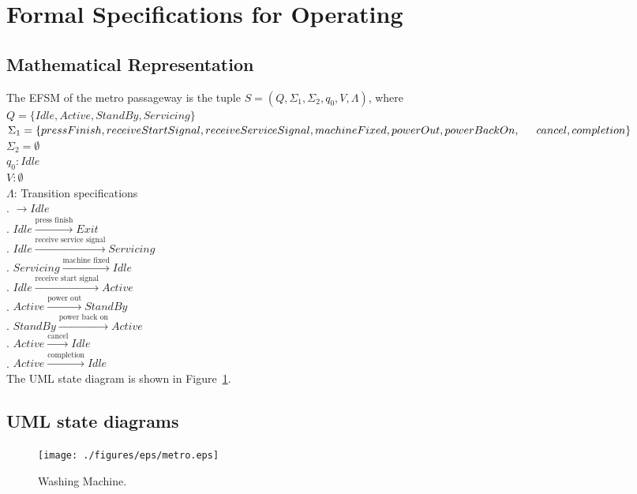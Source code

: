 \newpage
\section{Formal Specifications for Operating}

\subsection{Mathematical Representation}

\noindent The EFSM of the metro passageway is the tuple $S = (Q, \Sigma_1, \Sigma_2, q_0, V, \Lambda)$, where\\

\noindent $Q = \{Idle, Active, StandBy, Servicing\}$\\
\noindent $\Sigma_1 = \{press Finish, receive Start Signal, receive Service Signal, machine Fixed, power Out, power Back On, \\
\indent cancel, completion\}$\\
\noindent $\Sigma_2 = \emptyset$\\
\noindent $q_0: Idle$\\
\noindent $V: \emptyset$\\
\noindent $\Lambda$: Transition specifications\\
. $\rightarrow Idle$\\
. $Idle \xrightarrow {\text {press finish}} Exit$\\
. $Idle \xrightarrow {\text {receive service signal}} Servicing$\\
. $Servicing \xrightarrow {\text {machine fixed}} Idle$\\
. $Idle \xrightarrow {\text {receive start signal}} Active$\\
. $Active \xrightarrow {\text {power out}} StandBy$\\
. $StandBy \xrightarrow {\text {power back on}} Active$\\
. $Active \xrightarrow {\text {cancel}} Idle$\\
. $Active \xrightarrow {\text {completion}} Idle$\\

\noindent The UML state diagram is shown in Figure~\ref{fig:operating}.

\newpage

\subsection{UML state diagrams}

\begin{figure}[h!]
	\centering
		\texttt{[image: ./figures/eps/metro.eps]}
		  \caption{Washing Machine.}
  \label{fig:operating}
\end{figure}


